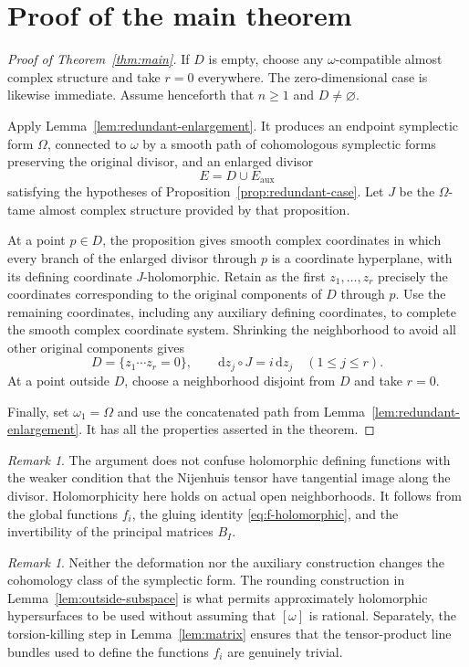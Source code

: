 \documentclass[11pt]{article}
\theoremstyle{definition}
\theoremstyle{remark}
\newtheorem{remark}[theorem]{Remark}
\newcommand{\dd}{\mathrm d}
\begin{document}
\section{Proof of the main theorem}

\begin{proof}[Proof of Theorem~\ref{thm:main}]
If $D$ is empty, choose any $\omega$-compatible almost complex
structure and take $r=0$ everywhere.  The zero-dimensional
case is likewise immediate.  Assume henceforth that $n\geq1$
and $D\neq\varnothing$.

Apply Lemma~\ref{lem:redundant-enlargement}.  It produces an
endpoint symplectic form $\Omega$, connected to $\omega$ by a
smooth path of cohomologous symplectic forms preserving the
original divisor, and an enlarged divisor
\[
E=D\cup E_{\mathrm{aux}}
\]
satisfying the hypotheses of
Proposition~\ref{prop:redundant-case}.  Let $J$ be the
$\Omega$-tame almost complex structure provided by that
proposition.

At a point $p\in D$, the proposition gives smooth complex
coordinates in which every branch of the enlarged divisor
through $p$ is a coordinate hyperplane, with its defining
coordinate $J$-holomorphic.  Retain as the first
$z_1,\ldots,z_r$ precisely the coordinates corresponding to
the original components of $D$ through $p$.  Use the remaining
coordinates, including any auxiliary defining coordinates, to
complete the smooth complex coordinate system.  Shrinking
the neighborhood to avoid all other original components gives
\[
D=\{z_1\cdots z_r=0\},\qquad
\dd z_j\circ J=i\,\dd z_j\quad(1\leq j\leq r).
\]
At a point outside $D$, choose a neighborhood disjoint from
$D$ and take $r=0$.

Finally, set $\omega_1=\Omega$ and use the concatenated path
from Lemma~\ref{lem:redundant-enlargement}.  It has all the
properties asserted in the theorem.
\end{proof}

\begin{remark}
The argument does not confuse holomorphic defining functions
with the weaker condition that the Nijenhuis tensor have
tangential image along the divisor.  Holomorphicity here holds
on actual open neighborhoods.  It follows from the global
functions $f_i$, the gluing identity
\eqref{eq:f-holomorphic}, and the invertibility of the principal
matrices $B_I$.
\end{remark}

\begin{remark}
Neither the deformation nor the auxiliary construction changes
the cohomology class of the symplectic form.  The rounding
construction in Lemma~\ref{lem:outside-subspace} is what permits
approximately holomorphic hypersurfaces to be used without
assuming that $[\omega]$ is rational.  Separately, the
torsion-killing step in Lemma~\ref{lem:matrix} ensures that the
tensor-product line bundles used to define the functions
$f_i$ are genuinely trivial.
\end{remark}
\end{document}
